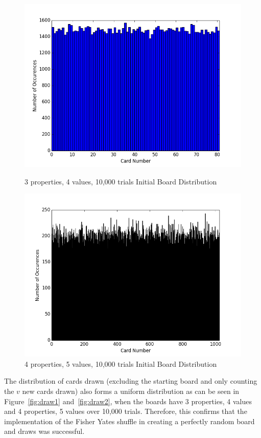 \documentclass[pageno]{jpaper}
\begin{document}
\begin{figure}[htbb]
\begin{minipage}[b]{0.5\linewidth}
\centering
\includegraphics[width=.75\linewidth]{3p4v10000Init.png}
\caption{3 properties, 4 values, 10,000 trials Initial Board Distribution}
\label{fig:init1}
\end{minipage}
\hspace{0.5cm}
\begin{minipage}[b]{0.5\linewidth}
\centering
\includegraphics[width=.75\linewidth]{4p5v10000Init.png}
\caption{4 properties, 5 values, 10,000 trials Initial Board Distribution}
\label{fig:init2}
\end{minipage}
\end{figure}


The distribution of cards drawn (excluding the starting board and only counting the $v$ new cards drawn) also forms a uniform distribution as can be seen in Figure~\ref{fig:draw1}  and~\ref{fig:draw2}, when the boards have 3 properties, 4 values and 4 properties, 5 values over 10,000 trials. Therefore, this confirms that the implementation of the Fisher Yates shuffle in creating a perfectly random board and draws was successful. 
\end{document}

